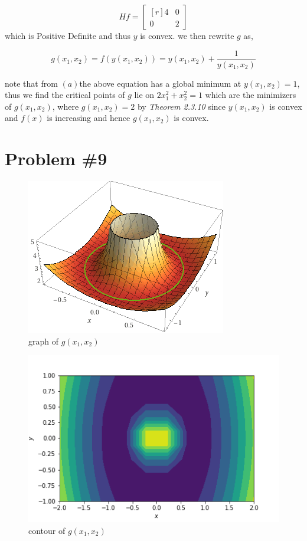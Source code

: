 \documentclass{article}
\begin{document}
\begin{equation*}
   Hf = \begin{bmatrix*}[r]
       
4 & 0 \\
0 & 2
\end{bmatrix*}
\end{equation*}
which is Positive Definite and thus $y$ is convex.
we then rewrite $g$ as,

\begin{equation*}
    g(x_1,x_2) = f(y(x_1,x_2)) = y(x_1,x_2) + \frac{1}{y(x_1,x_2)}
\end{equation*}

note that from $(a)$the above equation has a global minimum at $y(x_1,x_2) = 1$, thus we find the critical points of $g$ lie on $2x_1^2+x_2^2 = 1$ which are the minimizers of $g(x_1,x_2)$, where $g(x_1,x_2) = 2$ by \textit{Theorem 2.3.10} since $y(x_1,x_2)$ is convex and $f(x)$ is increasing and hence $g(x_1,x_2)$ is convex.

\section*{Problem \#9}
\begin{figure}[H]
    \centering
    \includegraphics[scale=0.8]{download.png}
    \caption{graph of $g(x_1,x_2)$}
    \label{fig:my_label}
\end{figure}

\begin{figure}[H]
    \centering
    \includegraphics[scale=0.6]{graph3Contour (2).png}
    \caption{contour of $g(x_1,x_2)$}
    \label{fig:my_label}
\end{figure}
\end{document}
